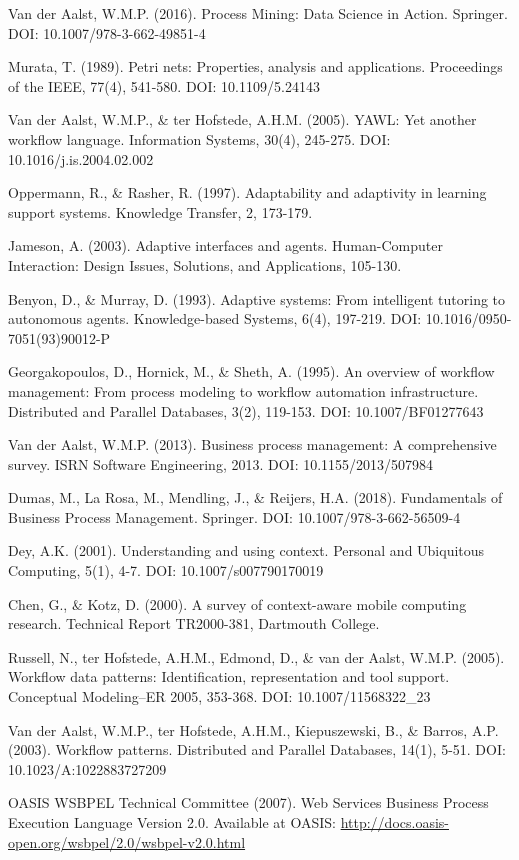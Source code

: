 \documentclass[11pt,a4paper]{article}
\begin{document}
Van der Aalst, W.M.P. (2016). Process Mining: Data Science in Action. Springer. DOI: 10.1007/978-3-662-49851-4

Murata, T. (1989). Petri nets: Properties, analysis and applications. Proceedings of the IEEE, 77(4), 541-580. DOI: 10.1109/5.24143

Van der Aalst, W.M.P., \& ter Hofstede, A.H.M. (2005). YAWL: Yet another workflow language. Information Systems, 30(4), 245-275. DOI: 10.1016/j.is.2004.02.002

Oppermann, R., \& Rasher, R. (1997). Adaptability and adaptivity in learning support systems. Knowledge Transfer, 2, 173-179.

Jameson, A. (2003). Adaptive interfaces and agents. Human-Computer Interaction: Design Issues, Solutions, and Applications, 105-130.

Benyon, D., \& Murray, D. (1993). Adaptive systems: From intelligent tutoring to autonomous agents. Knowledge-based Systems, 6(4), 197-219. DOI: 10.1016/0950-7051(93)90012-P

Georgakopoulos, D., Hornick, M., \& Sheth, A. (1995). An overview of workflow management: From process modeling to workflow automation infrastructure. Distributed and Parallel Databases, 3(2), 119-153. DOI: 10.1007/BF01277643

Van der Aalst, W.M.P. (2013). Business process management: A comprehensive survey. ISRN Software Engineering, 2013. DOI: 10.1155/2013/507984

Dumas, M., La Rosa, M., Mendling, J., \& Reijers, H.A. (2018). Fundamentals of Business Process Management. Springer. DOI: 10.1007/978-3-662-56509-4

Dey, A.K. (2001). Understanding and using context. Personal and Ubiquitous Computing, 5(1), 4-7. DOI: 10.1007/s007790170019

Chen, G., \& Kotz, D. (2000). A survey of context-aware mobile computing research. Technical Report TR2000-381, Dartmouth College.

Russell, N., ter Hofstede, A.H.M., Edmond, D., \& van der Aalst, W.M.P. (2005). Workflow data patterns: Identification, representation and tool support. Conceptual Modeling–ER 2005, 353-368. DOI: 10.1007/11568322\_23

Van der Aalst, W.M.P., ter Hofstede, A.H.M., Kiepuszewski, B., \& Barros, A.P. (2003). Workflow patterns. Distributed and Parallel Databases, 14(1), 5-51. DOI: 10.1023/A:1022883727209

OASIS WSBPEL Technical Committee (2007). Web Services Business Process Execution Language Version 2.0. Available at OASIS: \url{http://docs.oasis-open.org/wsbpel/2.0/wsbpel-v2.0.html}
\end{document}
